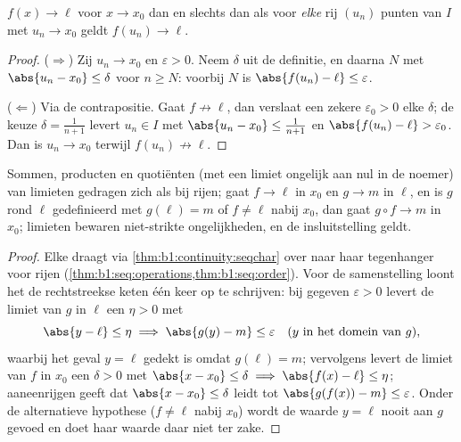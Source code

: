 \begin{theorem}\label{thm:b1:continuity:seqchar}
$f(x) \to \ell$ voor $x \to x_0$ dan en slechts dan als voor
\emph{elke} rij $(u_n)$ punten van $I$ met $u_n \to x_0$ geldt $f(u_n)
\to \ell$.
\end{theorem}

\begin{proof}
($\Rightarrow$) Zij $u_n \to x_0$ en $\varepsilon > 0$. Neem $\delta$ uit
de definitie, en daarna $N$ met $\abs{u_n - x_0} \leq \delta$ voor $n
\geq N$: voorbij $N$ is $\abs{f(u_n) - \ell} \leq \varepsilon$.

($\Leftarrow$) Via de contrapositie. Gaat $f \not\to \ell$, dan verslaat
een zekere $\varepsilon_0 > 0$ elke $\delta$; de keuze $\delta =
\frac{1}{n+1}$ levert $u_n \in I$ met $\abs{u_n - x_0} \leq
\frac{1}{n+1}$ en $\abs{f(u_n) - \ell} > \varepsilon_0$. Dan is $u_n \to
x_0$ terwijl $f(u_n) \not\to \ell$.
\end{proof}

\begin{corollary}\label{cor:b1:continuity:operations}
Sommen, producten en quotiënten (met een limiet ongelijk aan nul in de
noemer) van limieten gedragen zich als bij rijen; gaat $f \to \ell$ in
$x_0$ en $g \to m$ in $\ell$, en is $g$ rond $\ell$ gedefinieerd met
$g(\ell) = m$ of $f \neq \ell$ nabij $x_0$, dan gaat $g \circ f \to m$ in
$x_0$; limieten bewaren niet-strikte ongelijkheden, en de insluitstelling
geldt.
\end{corollary}

\begin{proof}
Elke  draagt via \cref{thm:b1:continuity:seqchar} over naar haar
tegenhanger voor rijen
(\cref{thm:b1:seq:operations,thm:b1:seq:order}). Voor de samenstelling
loont het de rechtstreekse keten één keer op te schrijven: bij gegeven
$\varepsilon > 0$ levert de limiet van $g$ in $\ell$ een $\eta > 0$ met
\[
\abs{y - \ell} \leq \eta \implies \abs{g(y) - m} \leq
\varepsilon \quad (y \text{ in het domein van } g),
\]
waarbij het geval $y = \ell$ gedekt is omdat $g(\ell) = m$; vervolgens
levert de limiet van $f$ in $x_0$ een $\delta > 0$ met $\abs{x - x_0}
\leq \delta \implies \abs{f(x) - \ell} \leq \eta$; aaneenrijgen geeft dat
$\abs{x - x_0} \leq \delta$ leidt tot $\abs{g(f(x)) - m} \leq
\varepsilon$. Onder de alternatieve hypothese ($f \neq \ell$ nabij $x_0$)
wordt de waarde $y = \ell$ nooit aan $g$ gevoed en doet haar waarde daar
niet ter zake.
\end{proof}

